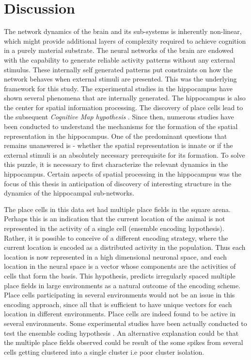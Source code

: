 \chapter{Discussion}

The network dynamics of the brain and its sub-systems is inherently non-linear, which might provide additional layers of complexity required to achieve cognition in a purely material substrate. The neural networks of the brain are endowed with the capability to generate reliable activity patterns without any external stimulus. These internally self generated patterns put constraints on how the network behaves when external stimuli are presented. This was the underlying framework for this study. The experimental studies in the hippocampus have shown several phenomena that are internally generated. The hippocampus is also the center for spatial information processing. The discovery of place cells \cite{O'Keefe1971a} lead to the subsequent \emph{Cognitive Map hypothesis} \cite{Street}. Since then, numerous studies have been conducted to understand the mechanisms for the formation of the spatial representation in the hippocampus. One of the predominant questions that remains unanswered is - whether the spatial representation is innate or if the external stimuli is an absolutely necessary prerequisite for its formation. To solve this puzzle, it is necessary to first characterize the relevant dynamics in the hippocampus. Certain aspects of spatial processing in the hippocampus was the focus of this thesis in anticipation of discovery of interesting structure in the dynamics of the hippocampal sub-networks. 

The place cells in this data set had multiple place fields in the square arena. Perhaps this is an indication that the current location of the animal is not represented in the activity of a single cell (ensemble encoding hypothesis). Rather, it is possible to conceive of a different encoding strategy, where the current location is encoded as a distributed activity in the population. Thus each location is now represented in a high dimensional neuronal space, and each location in the neural space is a vector whose components are the activities of cells that form the basis. This hypothesis, predicts irregularly spaced multiple place fields in large environments as a natural outcome of the encoding scheme. Place cells participating in several environments would not be an issue in this encoding approach, since all that is sufficient to have unique vectors for each location in different environments. Place cells are indeed found to be active in several environments\cite{Kubie1987}. Some experimental studies have been actually conducted to test the ensemble coding hypothesis \cite{Fenton2008}.  An alternative explanation could be that the multiple place fields observed could be result of the some spikes from several cells getting clustered into a single cluster i.e poor cluster isolation.


